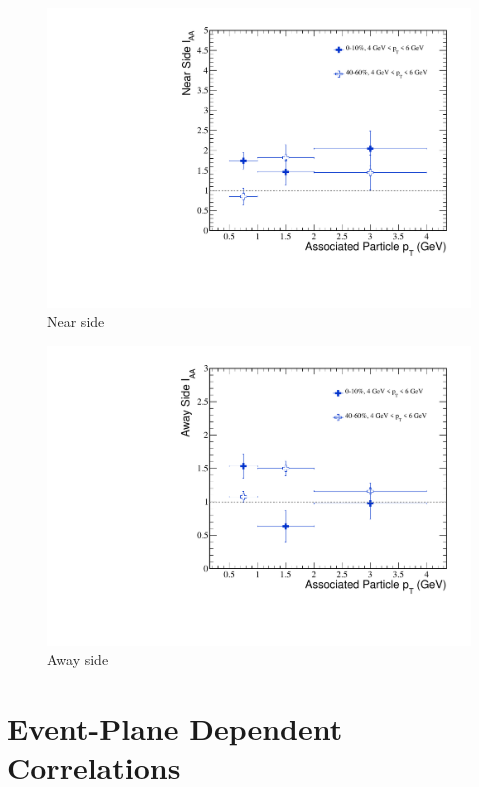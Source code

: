 \begin{figure}[htbp]
\begin{center}
\includegraphics[scale=.75]{Plots/Correlations/IAA_Near.pdf}
\end{center}
\caption[Near Side $I_{AA}$]{Near side}
\label{fig:IAA_Near}
\end{figure}

\begin{figure}[htbp]
\begin{center}
\includegraphics[scale=.75]{Plots/Correlations/IAA_Away.pdf}
\end{center}
\caption[Away Side $I_{AA}$]{Away side}
\label{fig:IAA_Away}
\end{figure}

\section{Event-Plane Dependent Correlations}

